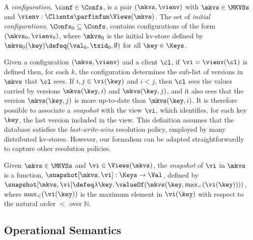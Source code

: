 \begin{definition}[Configurations]
\label{def:configuration}
A \emph{configuration}, $\conf \in \Confs $,  is a pair $ (\mkvs, \vienv)$
with $\mkvs \in \MKVSs$ and
$\vienv : \Clients \parfinfun \Views(\mkvs)$. 
The set of \emph{initial configurations}, $\Confs_0 \subseteq \Confs$,
contains configurations of the form $ (\mkvs_0, \vienv_0)$, where
$\mkvs_0$ is the initial kv-store defined by
$\mkvs_{0}(\key)\defeq  (\val_0, \txid_0, \emptyset)$ for
all $\key \in \Keys$. 
\end{definition}


Given a configuration $(\mkvs, \vienv)$ and a client $\cl$, 
if $\vi = \vienv(\cl)$ is defined then, for each $k$,  the
configuration determines the sub-list of versions in $\mkvs$ that $\cl$ sees.
If $i,j \in \vi(\key)$ and $i < j$, then $\cl$ sees the values 
carried by versions $\mkvs(\key, i)$ and  $\mkvs(\key, j)$, 
and it also sees that the version 
$\mkvs(\key, j)$ is more 
up-to-date than $\mkvs(\key, i)$. 
It is therefore possible to associate a \emph{snapshot}
with the view $\vi$, 
which identifies, for each key $\key$, the last version included in the view. 
This definition assumes that the database satisfies the \emph{last-write-wins}
resolution policy, employed by many distributed kv-stores.
However, our formalism can be adapted straightforwardly  to capture other resolution policies. 

\begin{definition}
\label{def:snapshot}
Given $\mkvs \in \MKVSs$ and $\vi \in \Views(\mkvs)$, the \emph{snapshot} of $\vi$ in 
$\mkvs$ is a function, $\snapshot[\mkvs, \vi] : \Keys \to
\Val$,   defined by $\snapshot[\mkvs, \vi] \defeq \lambda \key \ldotp \valueOf(\mkvs(\key, \max_{<}(\vi(\key))))$, 
where $\max_{<}(\vi(\key))$ is the maximum element in $\vi(\key)$ with respect to the natural 
order $<$ over $\mathbb{N}$.
\end{definition}

\subsection{Operational Semantics}

